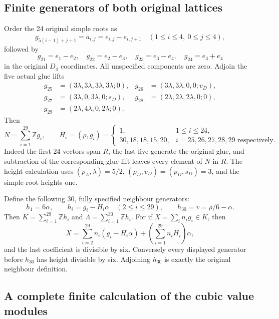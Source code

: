 \subsection{Finite generators of both original lattices}

Order the 24 original simple roots as
\[
 g_{5(i-1)+j+1}=a_{i,j}=e_{i,j}-e_{i,j+1}
 \quad(1\leq i\leq4,\ 0\leq j\leq4),
\]
followed by
\[
 g_{21}=e_1-e_2,\quad g_{22}=e_2-e_3,\quad
 g_{23}=e_3-e_4,\quad g_{24}=e_3+e_4
\]
in the original \(D_4\) coordinates.  All unspecified components
are zero.  Adjoin the five actual glue lifts
\begin{align*}
 g_{25}&=(3\lambda,3\lambda,3\lambda,3\lambda;0),&
 g_{26}&=(3\lambda,3\lambda,0,0;v_D),\\
 g_{27}&=(3\lambda,0,3\lambda,0;s_D),&
 g_{28}&=(2\lambda,2\lambda,2\lambda,0;0),\\
 g_{29}&=(2\lambda,4\lambda,0,2\lambda;0).
\end{align*}
Then
\begin{equation}
 N=\sum_{i=1}^{29}\mathbb Zg_i,\qquad
 H_i=(\rho,g_i)=
 \begin{cases}
 1,&1\leq i\leq24,\\
 30,18,18,15,20,&i=25,26,27,28,29\text{ respectively}.
 \end{cases}
 \label{nca:eq:N-generators}
\end{equation}
Indeed the first 24 vectors span \(R\), the last five generate
the original glue, and subtraction of the corresponding glue lift
leaves every element of \(N\) in \(R\).  The height calculation
uses \((\rho_A,\lambda)=5/2\),
\((\rho_D,v_D)=(\rho_D,s_D)=3\), and the simple-root heights one.

Define the following 30, fully specified neighbour generators:
\begin{equation}
 h_1=6\alpha,\qquad h_i=g_i-H_i\alpha\quad(2\leq i\leq29),
 \qquad h_{30}=v=\rho/6-\alpha.
 \label{nca:eq:Lambda-generators}
\end{equation}
Then \(K=\sum_{i=1}^{29}\mathbb Zh_i\) and
\(\Lambda=\sum_{i=1}^{30}\mathbb Zh_i\).
For if \(X=\sum_i n_ig_i\in K\), then
\[
 X=\sum_{i=2}^{29}n_i(g_i-H_i\alpha)
                         +\left(\sum_{i=1}^{29}n_iH_i\right)\alpha,
\]
and the last coefficient is divisible by six. Conversely every
displayed generator before \(h_{30}\) has height divisible by six.
Adjoining \(h_{30}\) is exactly the original neighbour definition.

\subsection{A complete finite calculation of the cubic value modules}

